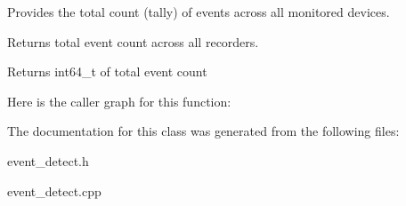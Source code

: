 Provides the total count (tally) of events across all monitored devices. 

Returns total event count across all recorders.

\begin{DoxyReturn}{Returns}
int64\+\_\+t of total event count


\end{DoxyReturn}
Here is the caller graph for this function\+:


The documentation for this class was generated from the following files\+:\begin{DoxyCompactItemize}
\item 
event\+\_\+detect.\+h\item 
event\+\_\+detect.\+cpp\end{DoxyCompactItemize}
